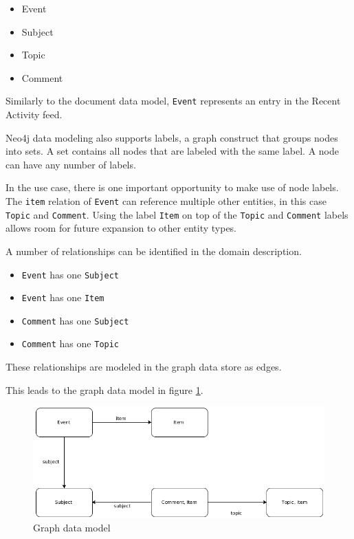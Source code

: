 \begin{itemize}
  \item Event
  \item Subject
  \item Topic
  \item Comment
\end{itemize}

Similarly to the document data model, \texttt{Event} represents an entry in the Recent Activity feed.

Neo4j data modeling also supports labels, a graph construct that groups nodes into sets.
A set contains all nodes that are labeled with the same label.
A node can have any number of labels.

In the use case, there is one important opportunity to make use of node labels.
The \texttt{item} relation of \texttt{Event} can reference multiple other entities, in this case \texttt{Topic} and \texttt{Comment}.
Using the label \texttt{Item} on top of the \texttt{Topic} and \texttt{Comment} labels allows room for future expansion to other entity types.

A number of relationships can be identified in the domain description.

\begin{itemize}
  \item \texttt{Event} has one \texttt{Subject}
  \item \texttt{Event} has one \texttt{Item}
  \item \texttt{Comment} has one \texttt{Subject}
  \item \texttt{Comment} has one \texttt{Topic}
\end{itemize}

These relationships are modeled in the graph data store as edges.

This leads to the graph data model in figure \ref{fig:graph-model}.

\begin{figure}
  \centering
  \includegraphics[width=.8\textwidth]{img/graph-model.png}
  \caption{Graph data model}
  \label{fig:graph-model}
\end{figure}

